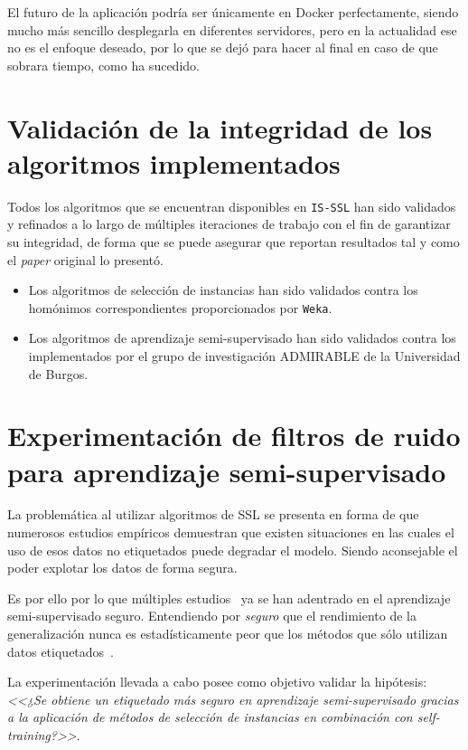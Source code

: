 El futuro de la aplicación podría ser únicamente en Docker perfectamente, siendo mucho más sencillo desplegarla en diferentes servidores, pero en la actualidad ese no es el enfoque deseado, por lo que se dejó para hacer al final en caso de que sobrara tiempo, como ha sucedido.

\section{Validación de la integridad de los algoritmos implementados}
Todos los algoritmos que se encuentran disponibles en \texttt{IS-SSL} han sido validados y refinados a lo largo de múltiples iteraciones de trabajo con el fin de garantizar su integridad, de forma que se puede asegurar que reportan resultados tal y como el \textit{paper} original lo presentó.

\begin{itemize}
\item Los algoritmos de selección de instancias han sido validados contra los homónimos correspondientes proporcionados por \texttt{Weka}.
\item Los algoritmos de aprendizaje semi-supervisado han sido validados contra los implementados por el grupo de investigación ADMIRABLE de la Universidad de Burgos.
\end{itemize}


\section{Experimentación de filtros de ruido para aprendizaje semi-supervisado}
La problemática al utilizar algoritmos de SSL se presenta en forma de que numerosos estudios empíricos demuestran que existen situaciones en las cuales el uso de esos datos no etiquetados puede degradar el modelo. Siendo aconsejable el poder explotar los datos de forma segura.

Es por ello por lo que múltiples estudios~\cite{zhao2021safe, guo2020safe, li2016towards} ya se han adentrado en el aprendizaje semi-supervisado seguro. Entendiendo por \emph{seguro} que el rendimiento de la generalización nunca es estadísticamente peor que los métodos que sólo utilizan datos etiquetados~\cite{li2019safe}.

La experimentación llevada a cabo posee como objetivo validar la hipótesis:\\
\emph{<<¿Se obtiene un etiquetado más seguro en aprendizaje semi-supervisado gracias a la aplicación de métodos de selección de instancias en combinación con self-training?>>}.

